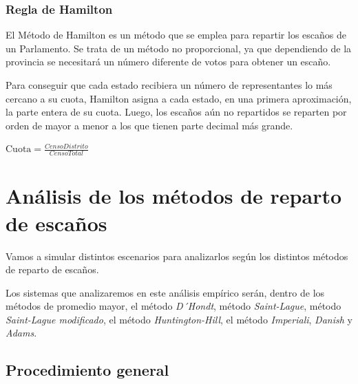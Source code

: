 \documentclass[12pt,a4paper,]{book}
\def\ifdoblecara{} %
\def\ifprincipal{} %
\numberwithin{dummy}{section}
\theoremstyle{ocrenumbox}
\theoremstyle{blacknumex}
\theoremstyle{blacknumbox}
\theoremstyle{ocrenum}
\theoremstyle{ocrenum}
\begin{document}
\hypertarget{regla-de-hamilton}{%
\subsection{Regla de Hamilton}\label{regla-de-hamilton}}

El Método de Hamilton es un método que se emplea para repartir los
escaños de un Parlamento. Se trata de un método no proporcional, ya que
dependiendo de la provincia se necesitará un número diferente de votos
para obtener un escaño.

Para conseguir que cada estado recibiera un número de representantes lo
más cercano a su cuota, Hamilton asigna a cada estado, en una primera
aproximación, la parte entera de su cuota. Luego, los escaños aún no
repartidos se reparten por orden de mayor a menor a los que tienen parte
decimal más grande.

\(\textrm{Cuota} = \frac{Censo Distrito}{Censo Total}\)

\FloatBarrier

\ifdefined\ifprincipal
\else
\setlength{\parindent}{1em}
\pagestyle{fancy}
\setcounter{tocdepth}{4}
\tableofcontents

\fi

\ifdefined\ifdoblecara
\fancyhead{}{}
\fancyhead[LE,RO]{\scriptsize\rightmark}
\fancyfoot[LO,RE]{\scriptsize\slshape \leftmark}
\fancyfoot[C]{}
\fancyfoot[LE,RO]{\footnotesize\thepage}
\else
\fancyhead{}{}
\fancyhead[RO]{\scriptsize\rightmark}
\fancyfoot[LO]{\scriptsize\slshape \leftmark}
\fancyfoot[C]{}
\fancyfoot[RO]{\footnotesize\thepage}
\fi
\renewcommand{\headrulewidth}{0.4pt}
\renewcommand{\footrulewidth}{0.4pt}

\hypertarget{anuxe1lisis-de-los-muxe9todos-de-reparto-de-escauxf1os}{%
\chapter{Análisis de los métodos de reparto de
escaños}\label{anuxe1lisis-de-los-muxe9todos-de-reparto-de-escauxf1os}}

Vamos a simular distintos escenarios para analizarlos según los
distintos métodos de reparto de escaños.

Los sistemas que analizaremos en este análisis empírico serán, dentro de
los métodos de promedio mayor, el método \emph{D´Hondt}, método
\emph{Saint-Lague}, método \emph{Saint-Lague modificado}, el método
\emph{Huntington-Hill}, el método \emph{Imperiali}, \emph{Danish} y
\emph{Adams}.

\hypertarget{procedimiento-general}{%
\section{Procedimiento general}\label{procedimiento-general}}
\end{document}
